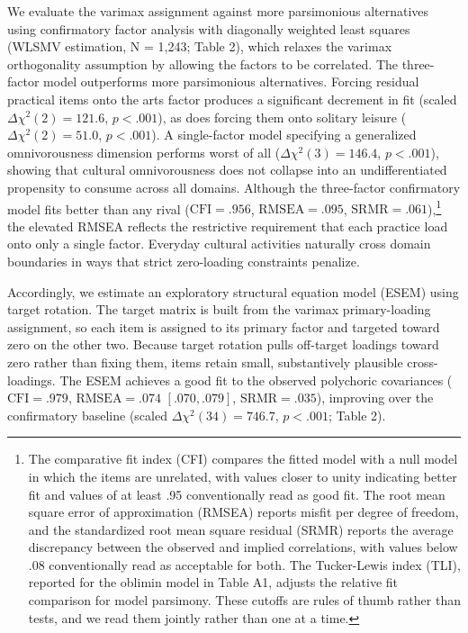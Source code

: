 \documentclass[
  12pt
]{article}
\begin{document}
We evaluate the varimax assignment against more parsimonious alternatives using confirmatory factor analysis with diagonally weighted least squares (WLSMV estimation, N = 1,243; Table 2), which relaxes the varimax orthogonality assumption by allowing the factors to be correlated. The three-factor model outperforms more parsimonious alternatives. Forcing residual practical items onto the arts factor produces a significant decrement in fit (scaled $\Delta\chi^2(2) = 121.6$, $p < .001$), as does forcing them onto solitary leisure ($\Delta\chi^2(2) = 51.0$, $p < .001$). A single-factor model specifying a generalized omnivorousness dimension performs worst of all ($\Delta\chi^2(3) = 146.4$, $p < .001$), showing that cultural omnivorousness does not collapse into an undifferentiated propensity to consume across all domains. Although the three-factor confirmatory model fits better than any rival ($\text{CFI} = .956$, $\text{RMSEA} = .095$, $\text{SRMR} = .061$),\footnote{The comparative fit index (CFI) compares the fitted model with a null model in which the items are unrelated, with values closer to unity indicating better fit and values of at least .95 conventionally read as good fit. The root mean square error of approximation (RMSEA) reports misfit per degree of freedom, and the standardized root mean square residual (SRMR) reports the average discrepancy between the observed and implied correlations, with values below .08 conventionally read as acceptable for both. The Tucker-Lewis index (TLI), reported for the oblimin model in Table A1, adjusts the relative fit comparison for model parsimony. These cutoffs are rules of thumb rather than tests, and we read them jointly rather than one at a time.} the elevated RMSEA reflects the restrictive requirement that each practice load onto only a single factor. Everyday cultural activities naturally cross domain boundaries in ways that strict zero-loading constraints penalize.

Accordingly, we estimate an exploratory structural equation model (ESEM) using target rotation. The target matrix is built from the varimax primary-loading assignment, so each item is assigned to its primary factor and targeted toward zero on the other two. Because target rotation pulls off-target loadings toward zero rather than fixing them, items retain small, substantively plausible cross-loadings. The ESEM achieves a good fit to the observed polychoric covariances ($\text{CFI} = .979$, $\text{RMSEA} = .074$ $[.070, .079]$, $\text{SRMR} = .035$), improving over the confirmatory baseline (scaled $\Delta\chi^2(34) = 746.7$, $p < .001$; Table 2). 
\end{document}
